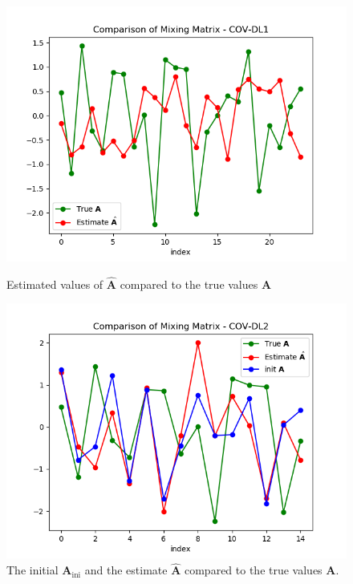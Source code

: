 \begin{figure}[H]
    \begin{minipage}[t]{.45\textwidth}
		\centering
		\includegraphics[scale=0.5]{figures/ch_6/COV1_simple.png}
		\caption{Estimated values of $\hat{\mathbf{A}}$ compared to the true 				values $\mathbf{A}$}
		\label{fig:cov1_simple}
    \end{minipage} 
    \hfill
    \begin{minipage}[t]{.45\textwidth}
        \centering
		\includegraphics[scale=0.5]{figures/ch_6/COV2_simple.png}
		\caption{The initial $\mathbf{A}_{\text{ini}}$ and the estimate $\hat{\mathbf{A}}$ 				compared to the true values $\mathbf{A}$. }
		\label{fig:cov2_simple}
    \end{minipage}
\end{figure}

